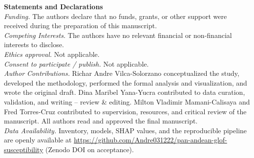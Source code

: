 \documentclass[11pt]{article}
\begin{document}
{\bfseries Statements and Declarations}\\[0.6em]
\textit{Funding.} The authors declare that no funds, grants, or other
support were received during the preparation of this manuscript.\\[0.4em]
\textit{Competing Interests.} The authors have no relevant financial or
non-financial interests to disclose.\\[0.4em]
\textit{Ethics approval.} Not applicable.\\[0.4em]
\textit{Consent to participate / publish.} Not applicable.\\[0.4em]
\textit{Author Contributions.} Richar Andre Vilca-Solorzano conceptualized
the study, developed the methodology, performed the formal analysis and
visualization, and wrote the original draft. Dina Maribel Yana-Yucra
contributed to data curation, validation, and writing -- review \& editing.
Milton Vladimir Mamani-Calisaya and Fred Torres-Cruz contributed to
supervision, resources, and critical review of the manuscript. All authors
read and approved the final manuscript.\\[0.4em]
\textit{Data Availability.} Inventory, models, SHAP values, and the
reproducible pipeline are openly available at
\url{https://github.com/Andre031222/pan-andean-glof-susceptibility}
(Zenodo DOI on acceptance).
\end{document}
